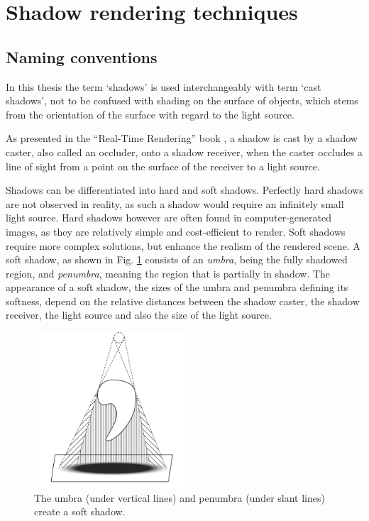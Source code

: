 \section{Shadow rendering techniques}

\subsection{Naming conventions}

In this thesis the term `shadows' is used interchangeably with term `cast shadows', not to be confused with shading on the surface of objects, which stems from the orientation of the surface with regard to the light source.

As presented in the ``Real-Time Rendering'' book \cite{bib:book:real_time_rendering}, a shadow is cast by a shadow caster, also called an occluder, onto a shadow receiver, when the caster occludes a line of sight from a point on the surface of the receiver to a light source.

Shadows can be differentiated into hard and soft shadows. Perfectly hard shadows are not observed in reality, as such a shadow would require an infinitely small light source. Hard shadows however are often found in computer-generated images, as they are relatively simple and cost-efficient to render. Soft shadows require more complex solutions, but enhance the realism of the rendered scene. A soft shadow, as shown in Fig. \ref{fig:shadow_soft} consists of an \textit{umbra}, being the fully shadowed region, and \textit{penumbra}, meaning the region that is partially in shadow. The appearance of a soft shadow, the sizes of the umbra and penumbra defining its softness, depend on the relative distances between the shadow caster, the shadow receiver, the light source and also the size of the light source.

\begin{figure}
    \centering
    \includegraphics[width=0.5\textwidth]{./graf/shadow_example_soft.pdf}
    \caption{The umbra (under vertical lines) and penumbra (under slant lines) create a soft shadow.}
    \label{fig:shadow_soft}
\end{figure}

